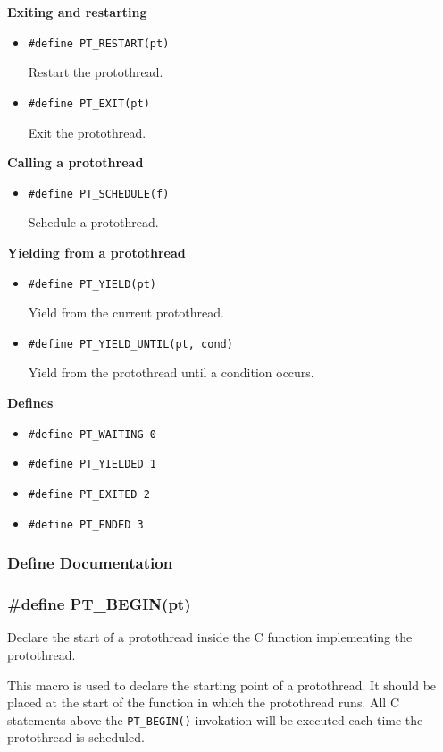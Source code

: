 \documentclass[12pt]{article}
\begin{document}
\begin{CJK}{UTF8}{bsmi}
\bf Exiting and restarting

\begin{itemize}
\item \verb+#define PT_RESTART(pt)+

Restart the protothread.

\item \verb+#define PT_EXIT(pt)+

Exit the protothread.
\end{itemize}

\bf Calling a protothread

\begin{itemize}
\item \verb+#define PT_SCHEDULE(f)+

Schedule a protothread.
\end{itemize}

\bf Yielding from a protothread

\begin{itemize}
\item \verb+#define PT_YIELD(pt)+

Yield from the current protothread.

\item \verb+#define PT_YIELD_UNTIL(pt, cond)+

Yield from the protothread until a condition occurs.
\end{itemize}

\bf Defines

\begin{itemize}
\item \verb+#define PT_WAITING 0+
\item \verb+#define PT_YIELDED 1+
\item \verb+#define PT_EXITED 2+
\item \verb+#define PT_ENDED 3+
\end{itemize}


\subsubsection{Define Documentation}

\subsubsection{\#define PT\_{}BEGIN(pt)}
Declare the start of a protothread inside the C function implementing the protothread.

This macro is used to declare the starting point of a protothread. It should be placed at the start of the function in which the protothread runs. All C statements above the \verb+PT_BEGIN()+ invokation will be executed each time the protothread is scheduled.



\end{CJK}
\end{document}
